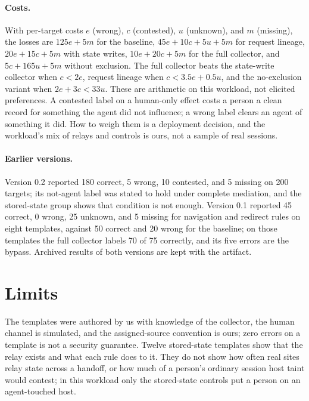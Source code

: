 \documentclass[11pt]{article}
\theoremstyle{definition}
\begin{document}
\paragraph{Costs.} With per-target costs $e$ (wrong), $c$ (contested), $u$
(unknown), and $m$ (missing), the losses are $125e+5m$ for the baseline,
$45e+10c+5u+5m$ for request lineage, $20e+15c+5m$ with state writes,
$10e+20c+5m$ for the full collector, and $5c+165u+5m$ without exclusion. The full
collector beats the state-write collector when $c<2e$, request lineage when
$c<3.5e+0.5u$, and the no-exclusion variant when $2e+3c<33u$. These are
arithmetic on this workload, not elicited preferences. A contested label on a
human-only effect costs a person a clean record for something the agent did not
influence; a wrong label clears an agent of something it did. How to weigh them
is a deployment decision, and the workload's mix of relays and controls is ours,
not a sample of real sessions.

\paragraph{Earlier versions.} Version 0.2 reported 180 correct, 5 wrong, 10
contested, and 5 missing on 200 targets; its not-agent label was stated to hold
under complete mediation, and the stored-state group shows that condition is not
enough. Version 0.1 reported 45 correct, 0 wrong, 25 unknown, and 5 missing for
navigation and redirect rules on eight templates, against 50 correct and 20 wrong
for the baseline; on those templates the full collector labels 70 of 75
correctly, and its five errors are the bypass. Archived results of both versions
are kept with the artifact.

\section{Limits}
The templates were authored by us with knowledge of the collector, the human
channel is simulated, and the assigned-source convention is ours; zero errors on a
template is not a security guarantee. Twelve stored-state templates show that the
relay exists and what each rule does to it. They do not show how often real sites
relay state across a handoff, or how much of a person's ordinary session host
taint would contest; in this workload only the stored-state controls put a person
on an agent-touched host.
\end{document}
